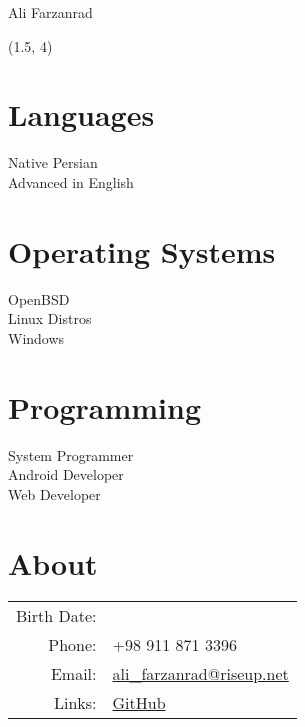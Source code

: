 \documentclass[a4paper,10pt]{article}
\newcommand{\birthdate}{\DTMdate{1990-05-10}}
\begin{document}
{\Huge Ali Farzanrad}

\begin{textblock}{3.8}(1.5, 4)
	\raggedleft
	\section*{Languages}

	Native Persian \\
	Advanced in English

	\section*{Operating Systems}

	OpenBSD \\
	Linux Distros \\
	Windows

	\section*{Programming}

	System Programmer \\
	Android Developer \\
	Web Developer

\end{textblock}

\section*{\color{purple}About}

\begin{tabular}{rl}
Birth Date: & {\birthdate} \\
Phone:	& +98 911 871 3396 \\
Email:	& \href{mailto:ali_farzanrad@riseup.net}
	    {ali\_farzanrad@riseup.net} \\
Links:	& \href{https://github.com/fmwviormv}{GitHub}
\end{tabular}
\end{document}
